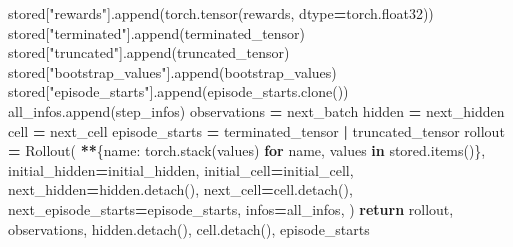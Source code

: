 \documentclass[
  american,
  11pt,
  letterpaper,
]{article}
\newenvironment{Shaded}{\begin{snugshade}}{\end{snugshade}}
\newcommand{\ControlFlowTok}[1]{\textcolor[rgb]{0.13,0.29,0.53}{\textbf{#1}}}
\newcommand{\KeywordTok}[1]{\textcolor[rgb]{0.13,0.29,0.53}{\textbf{#1}}}
\newcommand{\NormalTok}[1]{#1}
\newcommand{\OperatorTok}[1]{\textcolor[rgb]{0.81,0.36,0.00}{\textbf{#1}}}
\newcommand{\StringTok}[1]{\textcolor[rgb]{0.31,0.60,0.02}{#1}}
\renewenvironment{Shaded}{\par\smallskip}{\par\smallskip}
\begin{document}
\begin{Shaded}
\begin{Highlighting}[]
\NormalTok{        stored[}\StringTok{"rewards"}\NormalTok{].append(torch.tensor(rewards, dtype}\OperatorTok{=}\NormalTok{torch.float32))}
\NormalTok{        stored[}\StringTok{"terminated"}\NormalTok{].append(terminated\_tensor)}
\NormalTok{        stored[}\StringTok{"truncated"}\NormalTok{].append(truncated\_tensor)}
\NormalTok{        stored[}\StringTok{"bootstrap\_values"}\NormalTok{].append(bootstrap\_values)}
\NormalTok{        stored[}\StringTok{"episode\_starts"}\NormalTok{].append(episode\_starts.clone())}
\NormalTok{        all\_infos.append(step\_infos)}
\NormalTok{        observations }\OperatorTok{=}\NormalTok{ next\_batch}
\NormalTok{        hidden }\OperatorTok{=}\NormalTok{ next\_hidden}
\NormalTok{        cell }\OperatorTok{=}\NormalTok{ next\_cell}
\NormalTok{        episode\_starts }\OperatorTok{=}\NormalTok{ terminated\_tensor }\OperatorTok{|}\NormalTok{ truncated\_tensor}
\NormalTok{    rollout }\OperatorTok{=}\NormalTok{ Rollout(}
        \OperatorTok{**}\NormalTok{\{name: torch.stack(values) }\ControlFlowTok{for}\NormalTok{ name, values }\KeywordTok{in}\NormalTok{ stored.items()\},}
\NormalTok{        initial\_hidden}\OperatorTok{=}\NormalTok{initial\_hidden,}
\NormalTok{        initial\_cell}\OperatorTok{=}\NormalTok{initial\_cell,}
\NormalTok{        next\_hidden}\OperatorTok{=}\NormalTok{hidden.detach(),}
\NormalTok{        next\_cell}\OperatorTok{=}\NormalTok{cell.detach(),}
\NormalTok{        next\_episode\_starts}\OperatorTok{=}\NormalTok{episode\_starts,}
\NormalTok{        infos}\OperatorTok{=}\NormalTok{all\_infos,}
\NormalTok{    )}
    \ControlFlowTok{return}\NormalTok{ rollout, observations, hidden.detach(), cell.detach(), episode\_starts}



\end{Highlighting}
\end{Shaded}
\end{document}
